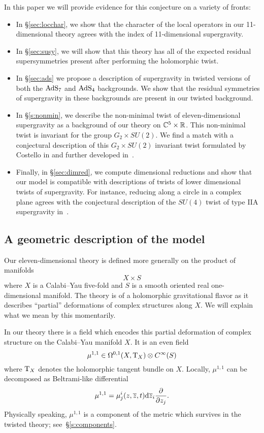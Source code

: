 In this paper we will provide evidence for this conjecture on a variety of fronts:
\begin{itemize}[leftmargin=\parindent,itemsep=\parskip]
\item 
In \S\ref{sec:locchar}, we show that the character of the local operators in our 11-dimensional theory agrees with the index of 11-dimensional supergravity. 
\item
In \S\ref{sec:susy}, we will show that this theory has all of the expected residual supersymmetries present after performing the holomorphic twist.
\item
In \S\ref{sec:ads} we propose a description of supergravity in twisted versions of both the ${\rm AdS}_7$ and ${\rm AdS}_4$ backgrounds. 
We show that the residual symmetries of supergravity in these backgrounds are present in our twisted background.
\item
In \S\ref{s:nonmin}, we describe the non-minimal twist of eleven-dimensional supergravity as a background of our theory on $\mathbb C^5 \times \mathbb R$. 
This non-minimal twist is invariant for the group $G_2 \times SU(2)$. 
We find a match with a conjectural description of this $G_2 \times SU(2)$ invariant twist formulated by Costello in \cite{CostelloM5} and further developed in~\cite{RY}.  
\item Finally, in \S\ref{sec:dimred}, we compute dimensional reductions and show that our model is compatible with descriptions of twists of lower dimensional twists of supergravity. 
For instance, reducing along a circle in a complex plane agrees with the conjectural description of the $SU(4)$ twist of type IIA supergravity in~\cite{CLsugra}.
\end{itemize}

\subsection*{A geometric description of the model} 

Our eleven-dimensional theory is defined more generally on the product of manifolds 
\[
X \times S
\]
where $X$ is a Calabi--Yau five-fold and $S$ is a smooth oriented real one-dimensional manifold. 
The theory is of a holomorphic gravitational flavor as it describes ``partial'' deformations of complex structures along $X$. 
We will explain what we mean by this momentarily. 

In our theory there is a field which encodes this partial deformation of complex structure on the Calabi--Yau manifold $X$.
It is an even field 
\[
\mu^{1,1} \in \Omega^{0,1} (X , {\rm T}_X) \otimes C^\infty(S) 
\]
where ${\rm T}_X$ denotes the holomorphic tangent bundle on $X$.
Locally, $\mu^{1,1}$ can be decomposed as Beltrami-like differential
\[
\mu^{1,1} = \mu^i_j (z,\overline{z}, t) {\rm d} \overline{z}_i \frac{\partial}{\partial z_j} .
\]
Physically speaking, $\mu^{1,1}$ is a component of the metric which survives in the twisted theory; see~\S\ref{s:components}. 

